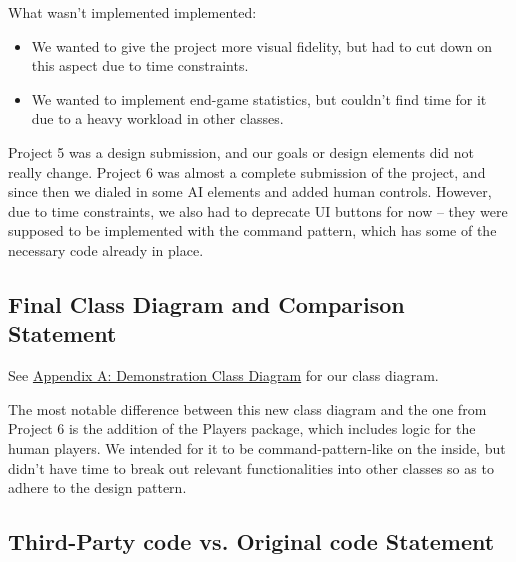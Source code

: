 \documentclass[11pt]{amsart}
\begin{document}
What wasn't implemented implemented:
\begin{itemize}
    \item We wanted to give the project more visual fidelity, but had to cut down on this aspect due to time constraints.
    \item We wanted to implement end-game statistics, but couldn't find time for it due to a heavy workload in other classes.
\end{itemize}

Project 5 was a design submission, and our goals or design elements did not really change. Project 6 was almost a complete submission of the project, and since then we dialed in some AI elements and added human controls. However, due to time constraints, we also had to deprecate UI buttons for now -- they were supposed to be implemented with the command pattern, which has some of the necessary code already in place.

\newpage
\subsection*{Final Class Diagram and Comparison Statement} \phantom{}





See \hyperref[sec:appendixa]{Appendix A: Demonstration Class Diagram} for our class diagram.

The most notable difference between this new class diagram and the one from Project 6 is the addition of the Players package, which includes logic for the human players. We intended for it to be command-pattern-like on the inside, but didn't have time to break out relevant functionalities into other classes so as to adhere to the design pattern.


\subsection*{Third-Party code vs. Original code Statement} \phantom{}
\end{document}
